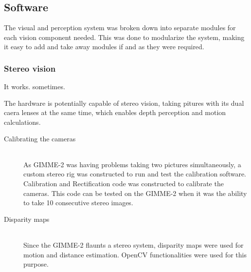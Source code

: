 \subsection{Software}
The visual and perception system was broken down into separate modules for each vision component needed. This was done to modularize the system, making it easy to add and take away modules if and as they were required.  
\subsubsection{Stereo vision}
It works. sometimes.

The hardware is potentially capable of stereo vision, taking pitures with its dual caera lenses at the same time, which enables depth perception and motion calculations.

\begin{description}
  \item [Calibrating the cameras] \hfill \\As GIMME-2 was having problems taking two pictures simultaneously, a custom stereo rig was constructed to run and test the calibration software. Calibration and Rectification code was constructed to calibrate the cameras. This code can be tested on the GIMME-2 when it was the ability to take 10 consecutive stereo images.
  \item [Disparity maps] \hfill \\Since the GIMME-2 flaunts a stereo system, disparity maps were used for motion and distance estimation. OpenCV functionalities were used for this purpose.

\end{description}

